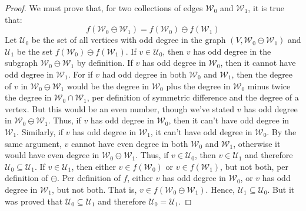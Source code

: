 \documentclass{article}
\theoremstyle{plain}
\theoremstyle{normal}
\begin{document}
            \begin{proof}
                We must prove that, for two collections of edges
                $\mathcal{W}_{0}$ and $\mathcal{W}_{1}$, it is true that:
                \begin{equation}
                    f(\mathcal{W}_{0}\ominus\mathcal{W}_{1})
                    =f(\mathcal{W}_{0})\ominus{f}(\mathcal{W}_{1})
                \end{equation}
                Let $\mathcal{U}_{0}$ be the set of all vertices with odd
                degree in the graph $(V,\mathcal{W}_{0}\ominus\mathcal{W}_{1})$
                and $\mathcal{U}_{1}$ be the set
                $f(\mathcal{W}_{0})\ominus{f}(\mathcal{W}_{1})$. If
                $v\in\mathcal{U}_{0}$, then $v$ has odd degree in the subgraph
                $\mathcal{W}_{0}\ominus\mathcal{W}_{1}$ by definition.
                If $v$ has odd degree in $\mathcal{W}_{0}$, then it cannot have
                odd degree in $\mathcal{W}_{1}$. For if $v$ had odd degree in
                both $\mathcal{W}_{0}$ and $\mathcal{W}_{1}$, then the degree
                of $v$ in $\mathcal{W}_{0}\ominus\mathcal{W}_{1}$ would be
                the degree in $\mathcal{W}_{0}$ plus the degree in
                $\mathcal{W}_{0}$ minus twice the degree in
                $\mathcal{W}_{0}\cap\mathcal{W}_{1}$, per definition of
                symmetric difference and the degree of a vertex. But this
                would be an even number, though we've stated $v$ has odd
                degree in $\mathcal{W}_{0}\ominus\mathcal{W}_{1}$. Thus, if
                $v$ has odd degree in $\mathcal{W}_{0}$, then it can't have
                odd degree in $\mathcal{W}_{1}$. Similarly, if
                $v$ has odd degree in $\mathcal{W}_{1}$, it can't have
                odd degree in $\mathcal{W}_{0}$. By the same argument, $v$
                cannot have even degree in both $\mathcal{W}_{0}$ and
                $\mathcal{W}_{1}$, otherwise it would have even degree in
                $\mathcal{W}_{0}\ominus\mathcal{W}_{1}$. Thus, if
                $v\in\mathcal{U}_{0}$, then $v\in\mathcal{U}_{1}$ and therefore
                $\mathcal{U}_{0}\subseteq\mathcal{U}_{1}$. If
                $v\in\mathcal{U}_{1}$, then either
                $v\in{f}(\mathcal{W}_{0})$ or $v\in{f}(\mathcal{W}_{1})$, but
                not both, per definition of $\ominus$. Per definition of $f$,
                either $v$ has odd degree in $\mathcal{W}_{0}$, or $v$ has
                odd degree in $\mathcal{W}_{1}$, but not both. That is,
                $v\in{f}(\mathcal{W}_{0}\ominus\mathcal{W}_{1})$. Hence,
                $\mathcal{U}_{1}\subseteq\mathcal{U}_{0}$. But it was proved
                that $\mathcal{U}_{0}\subseteq\mathcal{U}_{1}$ and therefore
                $\mathcal{U}_{0}=\mathcal{U}_{1}$.
            \end{proof}
\end{document}
